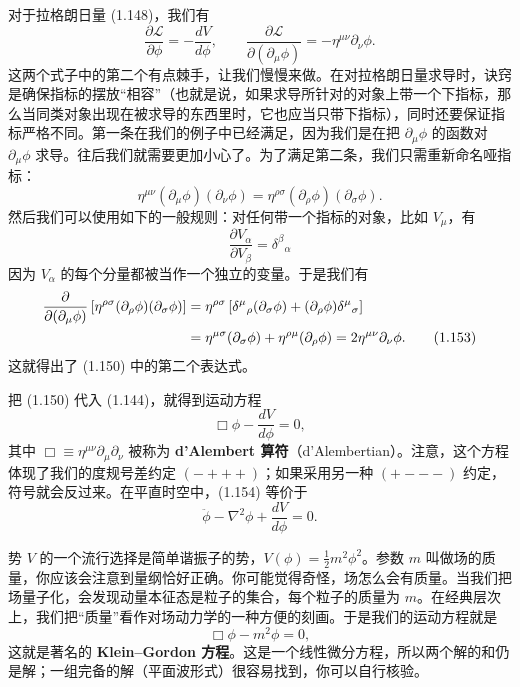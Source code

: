 对于拉格朗日量 (1.148)，我们有
\begin{equation*}
\frac{\partial\mathcal{L}}{\partial\phi} = -\frac{dV}{d\phi}, \qquad \frac{\partial\mathcal{L}}{\partial(\partial_{\mu}\phi)} = -\eta^{\mu\nu}\partial_{\nu}\phi.
\tag{1.150}
\end{equation*}
这两个式子中的第二个有点棘手，让我们慢慢来做。在对拉格朗日量求导时，诀窍是确保指标的摆放“相容”（也就是说，如果求导所针对的对象上带一个下指标，那么当同类对象出现在被求导的东西里时，它也应当只带下指标），同时还要保证指标严格不同。第一条在我们的例子中已经满足，因为我们是在把 $\partial_{\mu}\phi$ 的函数对 $\partial_{\mu}\phi$ 求导。往后我们就需要更加小心了。为了满足第二条，我们只需重新命名哑指标：
\begin{equation*}
\eta^{\mu\nu}(\partial_{\mu}\phi)(\partial_{\nu}\phi) = \eta^{\rho\sigma}(\partial_{\rho}\phi)(\partial_{\sigma}\phi).
\tag{1.151}
\end{equation*}
然后我们可以使用如下的一般规则：对任何带一个指标的对象，比如 $V_{\mu}$，有
\begin{equation*}
\frac{\partial V_{\alpha}}{\partial V_{\beta}} = \delta^{\beta}{}_{\alpha}
\tag{1.152}
\end{equation*}
因为 $V_{\alpha}$ 的每个分量都被当作一个独立的变量。于是我们有
\begin{align*}
\frac{\partial}{\partial(\partial_{\mu}\phi)}\left[\eta^{\rho\sigma}(\partial_{\rho}\phi)(\partial_{\sigma}\phi)\right] &= \eta^{\rho\sigma}\left[\delta^{\mu}{}_{\rho}(\partial_{\sigma}\phi) + (\partial_{\rho}\phi)\delta^{\mu}{}_{\sigma}\right]\notag\\
&= \eta^{\mu\sigma}(\partial_{\sigma}\phi) + \eta^{\rho\mu}(\partial_{\rho}\phi) = 2\eta^{\mu\nu}\partial_{\nu}\phi.
\tag{1.153}
\end{align*}
这就得出了 (1.150) 中的第二个表达式。

把 (1.150) 代入 (1.144)，就得到运动方程
\begin{equation*}
\Box\phi - \frac{dV}{d\phi} = 0,
\tag{1.154}
\end{equation*}
其中 $\Box\equiv\eta^{\mu\nu}\partial_{\mu}\partial_{\nu}$ 被称为 \textbf{d'Alembert 算符}（d'Alembertian）。注意，这个方程体现了我们的度规号差约定 $(-+++)$；如果采用另一种 $(+---)$ 约定，符号就会反过来。在平直时空中，(1.154) 等价于
\begin{equation*}
\ddot{\phi} - \nabla^{2}\phi + \frac{dV}{d\phi} = 0.
\tag{1.155}
\end{equation*}

势 $V$ 的一个流行选择是简单谐振子的势，$V(\phi)=\frac{1}{2}m^{2}\phi^{2}$。参数 $m$ 叫做场的质量，你应该会注意到量纲恰好正确。你可能觉得奇怪，场怎么会有质量。当我们把场量子化，会发现动量本征态是粒子的集合，每个粒子的质量为 $m$。在经典层次上，我们把“质量”看作对场动力学的一种方便的刻画。于是我们的运动方程就是
\begin{equation*}
\Box\phi - m^{2}\phi = 0,
\tag{1.156}
\end{equation*}
这就是著名的 \textbf{Klein--Gordon 方程}。这是一个线性微分方程，所以两个解的和仍是解；一组完备的解（平面波形式）很容易找到，你可以自行核验。

